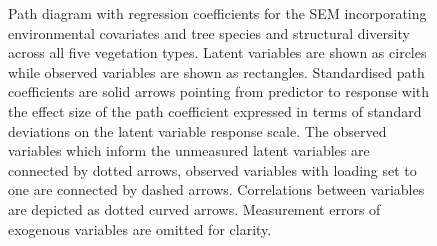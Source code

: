 \documentclass[11pt,a4paper]{article}
\begin{document}
\begin{figure}[H]
\centering
	
	\caption{Path diagram with regression coefficients for the SEM incorporating environmental covariates and tree species and structural diversity across all five vegetation types. Latent variables are shown as circles while observed variables are shown as rectangles. Standardised path coefficients are solid arrows pointing from predictor to response with the effect size of the path coefficient expressed in terms of standard deviations on the latent variable response scale. The observed variables which inform the unmeasured latent variables are connected by dotted arrows, observed variables with loading set to one are connected by dashed arrows. Correlations between variables are depicted as dotted curved arrows. Measurement errors of exogenous variables are omitted for clarity.}
	\label{full_mod}
\end{figure}


% 
% 
% 
% 
\end{document}

